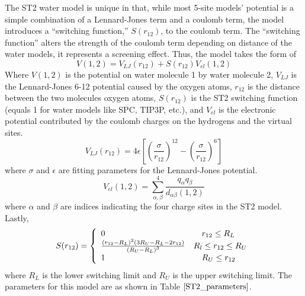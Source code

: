 The ST2 water model is unique in that, while most 5-site models' potential is a simple combination of a Lennard-Jones term and a coulomb term, the model introduces a ``switching function,'' $S(r_{12})$, to the coulomb term.  The ``switching function'' alters the strength of the coulomb term depending on distance of the water models, it represents a screening effect.  Thus, the model takes the form of
\begin{equation}
V(1,2) = V_{LJ}(r_{12})+S(r_{12})V_{el}(1,2)
\end{equation}
Where $V(1,2)$ is the potential on water molecule 1 by water molecule 2, $V_{LJ}$ is the Lennard-Jones 6-12 potential caused by the oxygen atoms, $r_{12}$ is the distance between the two molecules oxygen atoms, $S(r_{12})$ is the ST2 switching function (equals 1 for water models like SPC, TIP3P, etc.), and $V_{el}$ is the electronic potential contributed by the coulomb charges on the hydrogens and the virtual sites.
\begin{equation}
V_{LJ}(r_{12}) = 4\epsilon\left[\left(\frac{\sigma}{r_{12}}\right)^{12} - \left(\frac{\sigma}{r_{12}}\right)^6\right]
\end{equation}
where $\sigma$ and $\epsilon$ are fitting parameters for the Lennard-Jones potential.
\begin{equation}
	V_{el}(1,2) = \sum_{\alpha,\beta}^4\frac{q_\alpha q_\beta}{d_{\alpha\beta}(1,2)}
\end{equation}
where $\alpha$ and $\beta$ are indices indicating the four charge sites in the ST2 model. Lastly,
\begin{equation}
S(r_{12}) = \left\{ 
\begin{array}{l l}
0 & \quad r_{12} \le R_L\\
\frac{\left(r_{12}-R_L\right)^2\left(3R_U-R_L-2r_{12}\right)}{\left(R_U-R_L\right)^3} & R_l \le r_{12} \le R_U\\
1 & \quad R_U \le r_{12}
\end{array} \right.
\end{equation}
where $R_L$ is the lower switching limit and $R_U$ is the upper switching limit.  The parameters for this model are as shown in Table $\ref{ST2_parameters}$.
